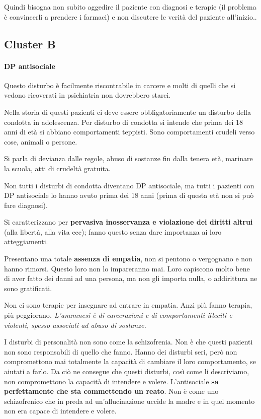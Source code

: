 Quindi bisogna non subito aggedire il paziente con diagnosi e terapie
(il problema è convincerli a prendere i farmaci) e non discutere le
verità del paziente all'inizio..

\subsection{Cluster B}

\paragraph{DP antisociale}

Questo disturbo è facilmente riscontrabile in carcere e molti di quelli
che si vedono ricoverati in psichiatria non dovrebbero starci.

Nella storia di questi pazienti ci deve essere obbligatoriamente un
disturbo della condotta in adolescenza. Per disturbo di condotta si
intende che prima dei 18 anni di età si abbiano comportamenti teppisti.
Sono comportamenti crudeli verso cose, animali o persone.

Si parla di devianza dalle regole, abuso di sostanze fin dalla tenera
età, marinare la scuola, atti di crudeltà gratuita.

Non tutti i disturbi di condotta diventano DP antisociale, ma tutti i
pazienti con DP antisociale lo hanno avuto prima dei 18 anni (prima di
questa età non si può fare diagnosi).

Si caratterizzano per \textbf{pervasiva inosservanza e violazione dei
diritti altrui} (alla libertà, alla vita ecc); fanno questo senza dare
importanza ai loro atteggiamenti.

Presentano una totale \textbf{assenza di empatia}, non si pentono o
vergognano e non hanno rimorsi. Questo loro non lo impareranno mai. Loro
capiscono molto bene di aver fatto dei danni ad una persona, ma non gli
importa nulla, o addirittura ne sono gratificati.

Non ci sono terapie per insegnare ad entrare in empatia. Anzi più fanno
terapia, più peggiorano\emph{. \emph{L'anamnesi è di carcerazioni e di
comportamenti illeciti e violenti, spesso associati ad abuso di
sostanze.}}

I disturbi di personalità non sono come la schizofrenia. Non è che
questi pazienti non sono responsabili di quello che fanno. Hanno dei
disturbi seri, però non compromettono mai totalmente la capacità di
cambiare il loro comportamento, se aiutati a farlo. Da ciò ne consegue
che questi disturbi, così come li descriviamo, non compromettono la
capacità di intendere e volere. L'antisociale \textbf{sa perfettamente
che sta commettendo un reato}. Non è come uno schizofrenico che in preda
ad un'allucinazione uccide la madre e in quel momento non era capace di
intendere e volere.

